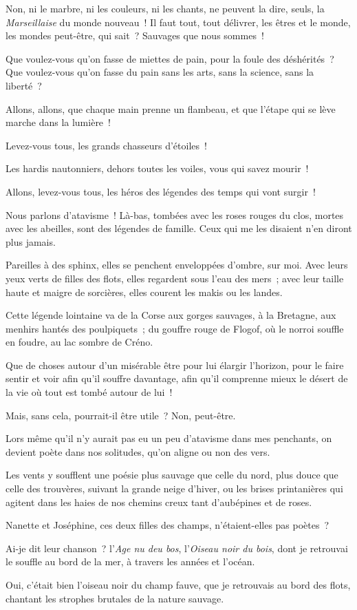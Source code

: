 \documentclass[french,twoside]{book} %
\newcommand\chapterclose{} %
\begin{document}
Non, ni le marbre, ni les couleurs, ni les chants, ne peuvent la dire, seuls, la \emph{Marseillaise} du monde nouveau ! Il faut tout, tout délivrer, les êtres et le monde, les mondes peut-être, qui sait ? Sauvages que nous sommes !\par
Que voulez-vous qu’on fasse de miettes de pain, pour la foule des déshérités ? Que voulez-vous qu’on fasse du pain sans les arts, sans la science, sans la liberté ?\par
Allons, allons, que chaque main prenne un flambeau, et que l’étape qui se lève marche dans la lumière !\par
Levez-vous tous, les grands chasseurs d’étoiles !\par
Les hardis nautonniers, dehors toutes les voiles, vous qui savez mourir !\par
Allons, levez-vous tous, les héros des légendes des temps qui vont surgir !\par
Nous parlons d’atavisme ! Là-bas, tombées avec les roses rouges du clos, mortes avec les abeilles, sont des légendes de famille. Ceux qui me les disaient n’en diront plus jamais.\par
Pareilles à des sphinx, elles se penchent enveloppées  d’ombre, sur moi. Avec leurs yeux verts de filles des flots, elles regardent sous l’eau des mers ; avec leur taille haute et maigre de sorcières, elles courent les makis ou les landes.\par
Cette légende lointaine va de la Corse aux gorges sauvages, à la Bretagne, aux menhirs hantés des poulpiquets ; du gouffre rouge de Flogof, où le norroi souffle en foudre, au lac sombre de Créno.\par
Que de choses autour d’un misérable être pour lui élargir l’horizon, pour le faire sentir et voir afin qu’il souffre davantage, afin qu’il comprenne mieux le désert de la vie où tout est tombé autour de lui !\par
Mais, sans cela, pourrait-il être utile ? Non, peut-être.\par
Lors même qu’il n’y aurait pas eu un peu d’atavisme dans mes penchants, on devient poète dans nos solitudes, qu’on aligne ou non des vers.\par
Les vents y soufflent une poésie plus sauvage que celle du nord, plus douce que celle des trouvères, suivant la grande neige d’hiver, ou les brises printanières qui agitent dans les haies de nos chemins creux tant d’aubépines et de roses.\par
Nanette et Joséphine, ces deux filles des champs, n’étaient-elles pas poètes ?\par
 Ai-je dit leur chanson ? l’\emph{Age nu deu bos}, l’\emph{Oiseau noir du bois}, dont je retrouvai le souffle au bord de la mer, à travers les années et l’océan.\par
Oui, c’était bien l’oiseau noir du champ fauve, que je retrouvais au bord des flots, chantant les strophes brutales de la nature sauvage.
\chapterclose
\end{document}
